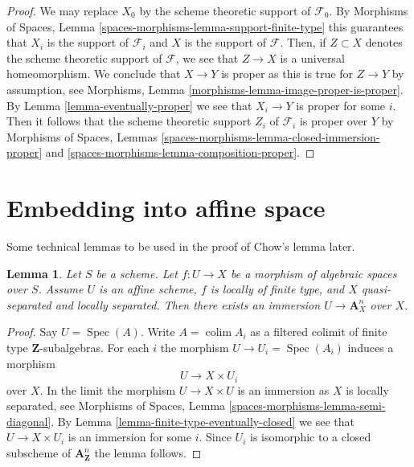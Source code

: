 \documentclass{stacks-project}
\theoremstyle{plain}
\newtheorem{lemma}[subsection]{Lemma}
\theoremstyle{definition}
\theoremstyle{remark}
\numberwithin{equation}{subsection}
\def\colim{\mathop{\mathrm{colim}}\nolimits}
\def\Spec{\mathop{\mathrm{Spec}}}
\begin{document}
\begin{proof}
We may replace $X_0$ by the scheme theoretic support of $\mathcal{F}_0$.
By Morphisms of Spaces, Lemma \ref{spaces-morphisms-lemma-support-finite-type}
this guarantees that $X_i$ is the support of $\mathcal{F}_i$ and $X$ is the
support of $\mathcal{F}$. Then, if $Z \subset X$ denotes the scheme
theoretic support of $\mathcal{F}$, we see that $Z \to X$ is a universal
homeomorphism. We conclude that $X \to Y$ is proper as this is true for
$Z \to Y$ by assumption, see
Morphisms, Lemma \ref{morphisms-lemma-image-proper-is-proper}.
By Lemma \ref{lemma-eventually-proper} we see that $X_i \to Y$ is proper
for some $i$. Then it follows that the scheme theoretic support $Z_i$ of
$\mathcal{F}_i$ is proper over $Y$ by
Morphisms of Spaces, Lemmas
\ref{spaces-morphisms-lemma-closed-immersion-proper} and
\ref{spaces-morphisms-lemma-composition-proper}.
\end{proof}








\section{Embedding into affine space}
\label{section-embedding}

\noindent
Some technical lemmas to be used in the proof of Chow's lemma later.

\begin{lemma}
\label{lemma-embedding-into-affine-over-ls-qs}
Let $S$ be a scheme. Let $f : U \to X$ be a morphism of algebraic
spaces over $S$. Assume $U$ is an affine scheme, $f$ is locally of
finite type, and $X$ quasi-separated and locally separated.
Then there exists an immersion $U \to \mathbf{A}^n_X$ over $X$.
\end{lemma}

\begin{proof}
Say $U = \Spec(A)$. Write $A = \colim A_i$ as a filtered colimit
of finite type $\mathbf{Z}$-subalgebras. For each $i$ the morphism
$U \to U_i = \Spec(A_i)$ induces a morphism
$$
U \longrightarrow X \times U_i
$$
over $X$. In the limit the morphism $U \to X \times U$ is an immersion
as $X$ is locally separated, see
Morphisms of Spaces, Lemma
\ref{spaces-morphisms-lemma-semi-diagonal}.
By Lemma \ref{lemma-finite-type-eventually-closed}
we see that $U \to X \times U_i$ is an immersion for some $i$.
Since $U_i$ is isomorphic to a closed subscheme of
$\mathbf{A}^n_{\mathbf{Z}}$ the lemma follows.
\end{proof}
\end{document}
